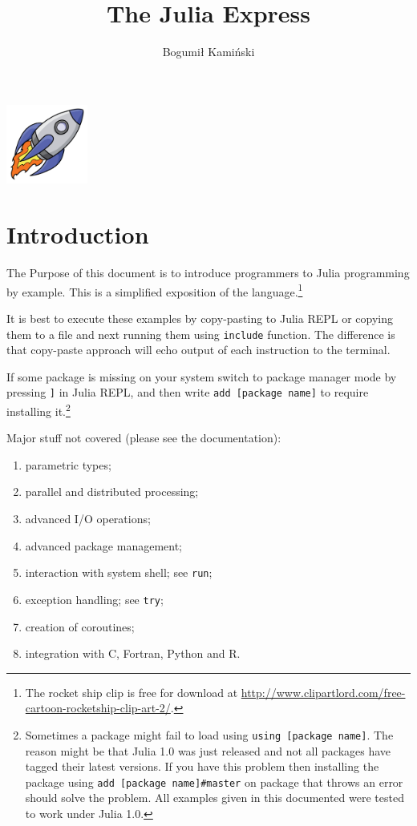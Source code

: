 \documentclass[10pt,a4paper]{article}
\begin{document}
\title{The Julia Express}
\author{Bogumił Kamiński}
\maketitle

{\centering
\includegraphics[width=0.2\textwidth]{rocketship11.png}\par
}

\tableofcontents

\section{Introduction}
The Purpose of this document is to introduce programmers to Julia programming by example.
This is a simplified exposition of the language.\footnote{The rocket ship clip is free for download at \url{http://www.clipartlord.com/free-cartoon-rocketship-clip-art-2/}.}

It is best to execute these examples by copy-pasting to Julia REPL or copying them to a file and next running them using \lstinline|include| function. The difference is that copy-paste approach will echo output of each instruction to the terminal.

If some package is missing on your system switch to package manager mode by pressing \lstinline|]| in Julia REPL, and then write \lstinline|add [package name]| to require installing it.\footnote{Sometimes a package might fail to load using \lstinline|using [package name]|. The reason might be that Julia 1.0 was just released and not all packages have tagged their latest versions. If you have this problem then installing the package using \lstinline|add [package name]#master| on package that throws an error should solve the problem. All examples given in this documented were tested to work under Julia 1.0.}

Major stuff not covered (please see the documentation):
\begin{enumerate}[label=\arabic*),nolistsep]
  \item parametric types;
  \item parallel and distributed processing;
  \item advanced I/O operations;
  \item advanced package management;
  \item interaction with system shell; see \lstinline|run|;
  \item exception handling; see \lstinline|try|;
  \item creation of coroutines;
  \item integration with C, Fortran, Python and R.
\end{enumerate}
\end{document}
